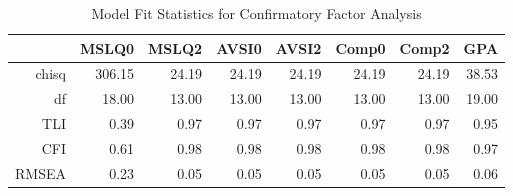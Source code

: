 \begin{table}[ht]
\centering
\begin{tabular}{rrrrrrrr}
  \hline
 & MSLQ0 & MSLQ2 & AVSI0 & AVSI2 & Comp0 & Comp2 & GPA \\ 
  \hline
chisq & 306.15 & 24.19 & 24.19 & 24.19 & 24.19 & 24.19 & 38.53 \\ 
  df & 18.00 & 13.00 & 13.00 & 13.00 & 13.00 & 13.00 & 19.00 \\ 
  TLI & 0.39 & 0.97 & 0.97 & 0.97 & 0.97 & 0.97 & 0.95 \\ 
  CFI & 0.61 & 0.98 & 0.98 & 0.98 & 0.98 & 0.98 & 0.97 \\ 
  RMSEA & 0.23 & 0.05 & 0.05 & 0.05 & 0.05 & 0.05 & 0.06 \\ 
   \hline
\end{tabular}
\caption{Model Fit Statistics for Confirmatory Factor Analysis} 
\label{fitstats}
\end{table}
